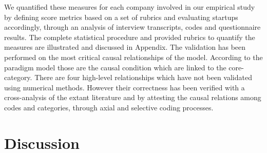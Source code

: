 \documentclass[10pt,journal,letterpaper,compsoc]{IEEEtran}
\begin{document}
We quantified these measures for each company involved in our empirical study 
by defining score metrics based on a set of rubrics and evaluating startups 
accordingly, through an analysis of interview transcripts, codes and 
questionnaire results. The complete statistical procedure and provided rubrics 
to quantify the measures are illustrated and discussed in Appendix.
The validation has been performed on the most critical  causal relationships of 
the model. According to the paradigm model those are the causal condition which 
are linked to the core-category. There are four high-level relationships  which 
have not been validated using numerical methods. However their correctness has 
been verified with a cross-analysis of the extant literature and by attesting 
the causal relations among codes and categories, through axial and selective 
coding processes. 


\section{Discussion} %
\label{sect:theory:impl}

\end{document}
